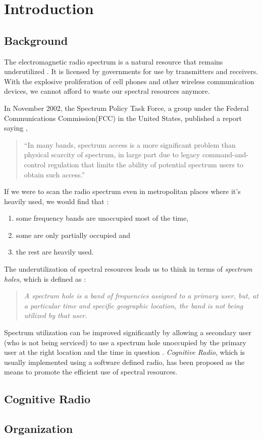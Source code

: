\chapter{Introduction}
\section{Background}
The electromagnetic radio spectrum is a natural resource that remains underutilized \cite{haykin05}. It is licensed by governments for use by transmitters and receivers. With the explosive proliferation of cell phones and other wireless communication devices, we cannot afford to waste our spectral resources anymore.

In November 2002, the Spectrum Policy Task Force, a group under the Federal Communications Commission(FCC) in the United States, published a report saying \cite{repFCC}, 
\begin{quote}
``In many bands, spectrum access is a more significant problem than physical scarcity of spectrum, in large part due to legacy command-and-control regulation that limits the ability of potential spectrum users to obtain such access.''
\end{quote}

If we were to scan the radio spectrum even in metropolitan places where it's heavily used, we would find that \cite{staple04} :
\begin{enumerate}
	\item some frequency bands are unoccupied most of the time,
	\item some are only partially occupied and
	\item the rest are heavily used.
\end{enumerate}

The underutilization of spectral resources leads us to think in terms of \emph{spectrum holes}, which is defined as \cite{kolodzy01}:
\begin{quote}
\emph{A spectrum hole is a band of frequencies assigned to a primary user, but, at a particular time and specific geographic location, the band is not being utilized by that user.
}
\end{quote}

Spectrum utilization can be improved significantly by allowing a secondary user (who is not being serviced) to use a spectrum hole unoccupied by the primary user at the right location and the time in question \cite{haykin05}. \emph{Cognitive Radio}, which is usually implemented using a software defined radio, has been proposed as the means to promote the efficient use of spectral resources.

\section{Cognitive Radio}



\section{Organization}

